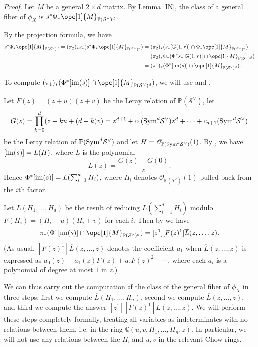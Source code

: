 \documentclass[12pt]{amsart}
\newcommand{\mb}{\mathbb}
\newcommand{\mc}{\mathcal}
\newcommand{\im}{{\rm im}}
\newcommand{\ol}{\overline}
\newcommand{\ms}{\mathscr}
\theoremstyle{plain}
\theoremstyle{definition}
\theoremstyle{remark}
\begin{document}
\begin{proof}
Let $M$ be a general $2\times d$ matrix. By Lemma \ref{IN}, the class of a general fiber of $\phi_X$ is $s^{*}\Phi_*\opc[1]{M}_{\mb{P}(\mc{S}^{\vee})^d}$.
\begin{center}
\end{center}
By the projection formula, we have
\begin{align*}
s^{*}\Phi_*\opc[1]{M}_{\mb{P}(\mc{S}^{\vee})^d} =(\pi_2)_{*}s_{*}(s^{*}\Phi_*\opc[1]{M}_{\mb{P}(\mc{S}^{\vee})^d})
&=(\pi_2)_{*}(s_{*}[\mb{G}(1,r)]\cap\Phi_*\opc[1]{M}_{\mb{P}(\mc{S}^{\vee})^d})\\
&=(\pi_2)_{*}\Phi_*(\Phi^*s_{*}[\mb{G}(1,r)]\cap\opc[1]{M}_{\mb{P}(\mc{S}^{\vee})^d})\\
&=(\pi_1)_*(\Phi^*[\im(s)] \cap \opc[1]{M}_{\mb{P}(\mc{S}^{\vee})^d}).
\end{align*}


To compute $(\pi_1)_*(\Phi^*[\im(s)] \cap \opc[1]{M}_{\mb{P}(\mc{S}^{\vee})^d})$, we will use  and .

Let $F(z) = (z+u)(z+v)$ be the Leray relation of $\mb{P}(\mc{S}^\vee)$, let
$$G(z)=\prod_{k=0}^d (z+ku+(d-k)v) = z^{d+1} + c_{1}({\rm Sym}^d\mc{S}^\vee)z^d + \cdots + c_{d+1}({\rm Sym}^d\mc{S}^\vee)$$ be the Leray relation of $\mb{P}({\rm Sym}^d\mc{S}^\vee)$ and let $H=\ms{O}_{\mb{P}({\rm Sym}^d\mc{S}^\vee)}(1)$. By , we have $[\im(s)] = L(H)$, where $L$ is the polynomial
$$L(z)=\frac{G(z)-G(0)}{z}.$$ Hence $\Phi^*[\im(s)] = L(\sum_{i=1}^d H_i)$, where $H_i$ denotes $\ms{O}_{\mb{P}(\mc{S}^{\vee})}(1)$ pulled back from the $i$th factor. 

Let $\ol{L}(H_1, \ldots, H_d)$ be the result of reducing $L(\sum_{i=1}^d H_i)$ modulo $F(H_i)=(H_i+u)(H_i+v)$ for each $i$. Then by  we have  \[\pi_*(\Phi^*[\im(s)] \cap \opc[1]{M}_{\mb{P}(\mc{S}^{\vee})^d})=[z^1][F(z)^1] \ol{L}(z, \ldots, z).\] (As usual, $[F(z)^1] \ol{L}(z, \ldots, z)$ denotes the coefficient $a_1$ when $\ol{L}(z, \ldots, z)$ is expressed as $a_0(z) + a_1(z) F(z) + a_2 F(z)^2 + \cdots$, where each $a_i$ is a polynomial of degree at most $1$ in $z$.)

We can thus carry out the computation of the class of the general fiber of $\phi_X$ in three steps: first we compute $\ol{L}(H_1, \ldots, H_n)$, second we compute $\ol{L}(z, \ldots, z)$, and third we compute the answer $[z^1][F(z)^1] \ol{L}(z, \ldots, z)$. We will perform these steps completely formally, treating all variables as indeterminates with no relations between them, i.e. in the ring $\mb{Q}(u,v,H_1,\ldots,H_n, z)$. In particular, we will not use any relations between the $H_i$ and $u,v$ in the relevant Chow rings.


\end{proof}
\end{document}
